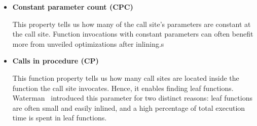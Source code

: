 \begin{itemize}
	\item \textbf{Constant parameter count (CPC)}

This property tells us how many of the call site's parameters are constant at
the call site. Function invocations with constant parameters can often benefit
more from unveiled optimizations after inlining.s

	\item \textbf{Calls in procedure (CP)}

This function property tells us how many call sites are located inside the
function the call site invocates. Hence, it enables finding leaf functions.
Waterman~\cite{AdaptvCompilAndInlingWaterman} introduced this parameter for two
distinct reasons: leaf functions are often small and easily inlined, and a high
percentage of total execution time is spent in leaf functions.

\end{itemize}
